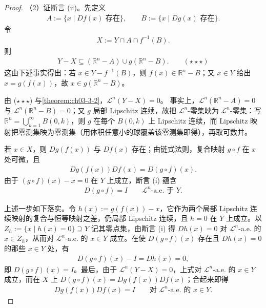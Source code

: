 \documentclass[../../main.tex]{subfiles}%
\begin{document}
\begin{proof}
（2）证断言 (ii)。先定义
\begin{align*}
A:=\{x\mid Df(x)\text{ 存在}\},\qquad B:=\{x\mid Dg(x)\text{ 存在}\}.
\end{align*}
令
\begin{align*}
X:=Y\cap A\cap f^{-1}(B).
\end{align*}
则
\begin{align*}
Y-X\subseteq(\mathbb{R}^n-A)\cup g(\mathbb{R}^n-B).\qquad(\star\star\star)
\end{align*}
这由下述事实得出：若 $x\in Y-f^{-1}(B)$，则 $f(x)\in\mathbb{R}^n-B$；又 $x\in Y$ 给出 $x=g(f(x))$，故 $x\in g(\mathbb{R}^n-B)$。

由 ($\star\star\star$) 与\cref{theorem:ch03-3-2}，$\mathcal{L}^n(Y-X)=0$。%
事实上，$\mathcal{L}^n(\mathbb{R}^n-A)=0$ 与 $\mathcal{L}^n(\mathbb{R}^n-B)=0$；又 $g$ 局部 Lipschitz 连续，故把 $\mathcal{L}^n$-零集映为 $\mathcal{L}^n$-零集：写 $\mathbb{R}^n=\bigcup_{k=1}^{\infty}B(0,k)$，则 $g$ 在每个 $B(0,k)$ 上 Lipschitz 连续，而 Lipschitz 映射把零测集映为零测集（用体积任意小的球覆盖该零测集即得），再取可数并。

若 $x\in X$，则 $Dg(f(x))$ 与 $Df(x)$ 存在；由链式法则，复合映射 $g\circ f$ 在 $x$ 处可微，且
\begin{align*}
Dg(f(x))Df(x)=D(g\circ f)(x).
\end{align*}
由于 $(g\circ f)(x)-x=0$ 在 $Y$ 上成立，断言 (i) 蕴含
\begin{align*}
D(g\circ f)=I\qquad\mathcal{L}^n\text{-a.e. 于 } Y.
\end{align*}

上述一步如下落实。令 $h(x):=g(f(x))-x$，它作为两个局部 Lipschitz 连续映射的复合与恒等映射之差，仍局部 Lipschitz 连续，且 $h=0$ 在 $Y$ 上成立。以 $Z_h:=\{x\mid h(x)=0\}\supseteq Y$ 记其零点集，由断言 (i) 得 $Dh(x)=0$ 对 $\mathcal{L}^n$-a.e. 的 $x\in Z_h$，从而对 $\mathcal{L}^n$-a.e. 的 $x\in Y$ 成立。在使 $D(g\circ f)(x)$ 存在且 $Dh(x)=0$ 的那些 $x\in Y$ 处，有
\begin{align*}
D(g\circ f)(x)-I=Dh(x)=0 ,
\end{align*}
即 $D(g\circ f)(x)=I$。最后，由于 $\mathcal{L}^n(Y-X)=0$，上式对 $\mathcal{L}^n$-a.e. 的 $x\in Y$ 成立，而在 $X$ 上 $D(g\circ f)(x)=Dg(f(x))Df(x)$；合起来即得
\begin{align*}
Dg(f(x))Df(x)=I\qquad\text{对 } \mathcal{L}^n\text{-a.e. 的 } x\in Y.
\end{align*}
\end{proof}
\end{document}
